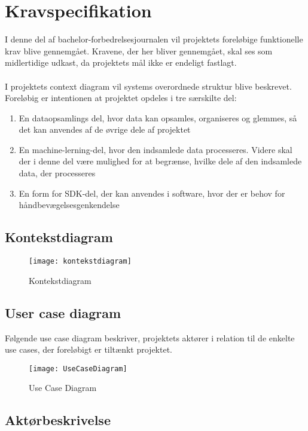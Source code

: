 \thispagestyle{fancy}
\chapter{Kravspecifikation}
I denne del af bachelor-forbedrelsesjournalen vil projektets foreløbige funktionelle krav blive gennemgået. Kravene, der her bliver gennemgået, skal ses som midlertidige udkast, da projektets mål ikke er endeligt fastlagt.
\\ \\
I projektets context diagram vil systems overordnede struktur blive beskrevet. \\
Foreløbig er intentionen at projektet opdeles i tre særskilte del:\\
\begin{enumerate}
	\item En dataopsamlings del, hvor data kan opsamles, organiseres og glemmes, så det kan anvendes af de øvrige dele af projektet
	\item En machine-lerning-del, hvor den indsamlede data processeres. Videre skal der i denne del være mulighed for at begrænse, hvilke dele af den indsamlede data, der processeres
	\item En form for SDK-del, der kan anvendes i software, hvor der er behov for håndbevægelsesgenkendelse
	
\end{enumerate}

\section{Kontekstdiagram}
\begin{figure}[h!]
	\centering
	\texttt{[image: kontekstdiagram]}
	\caption{Kontekstdiagram}
\end{figure}


\section{User case diagram}
Følgende use case diagram beskriver, projektets aktører i relation til de enkelte use cases, der foreløbigt er tiltænkt projektet.\\
\begin{figure}[h!]
	\centering
	\texttt{[image: UseCaseDiagram]}
	\caption{Use Case Diagram}
\end{figure}

\section{Aktørbeskrivelse}
